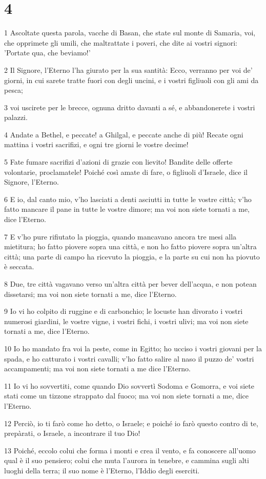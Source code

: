 \chapter{4}

\par 1 Ascoltate questa parola, vacche di Basan, che state sul monte di Samaria, voi, che opprimete gli umili, che maltrattate i poveri, che dite ai vostri signori: 'Portate qua, che beviamo!'
\par 2 Il Signore, l'Eterno l'ha giurato per la sua santità: Ecco, verranno per voi de' giorni, in cui sarete tratte fuori con degli uncini, e i vostri figliuoli con gli ami da pesca;
\par 3 voi uscirete per le brecce, ognuna dritto davanti a sé, e abbandonerete i vostri palazzi.
\par 4 Andate a Bethel, e peccate! a Ghilgal, e peccate anche di più! Recate ogni mattina i vostri sacrifizi, e ogni tre giorni le vostre decime!
\par 5 Fate fumare sacrifizi d'azioni di grazie con lievito! Bandite delle offerte volontarie, proclamatele! Poiché così amate di fare, o figliuoli d'Israele, dice il Signore, l'Eterno.
\par 6 E io, dal canto mio, v'ho lasciati a denti asciutti in tutte le vostre città; v'ho fatto mancare il pane in tutte le vostre dimore; ma voi non siete tornati a me, dice l'Eterno.
\par 7 E v'ho pure rifiutato la pioggia, quando mancavano ancora tre mesi alla mietitura; ho fatto piovere sopra una città, e non ho fatto piovere sopra un'altra città; una parte di campo ha ricevuto la pioggia, e la parte su cui non ha piovuto è seccata.
\par 8 Due, tre città vagavano verso un'altra città per bever dell'acqua, e non potean dissetarsi; ma voi non siete tornati a me, dice l'Eterno.
\par 9 Io vi ho colpito di ruggine e di carbonchio; le locuste han divorato i vostri numerosi giardini, le vostre vigne, i vostri fichi, i vostri ulivi; ma voi non siete tornati a me, dice l'Eterno.
\par 10 Io ho mandato fra voi la peste, come in Egitto; ho ucciso i vostri giovani per la spada, e ho catturato i vostri cavalli; v'ho fatto salire al naso il puzzo de' vostri accampamenti; ma voi non siete tornati a me dice l'Eterno.
\par 11 Io vi ho sovvertiti, come quando Dio sovvertì Sodoma e Gomorra, e voi siete stati come un tizzone strappato dal fuoco; ma voi non siete tornati a me, dice l'Eterno.
\par 12 Perciò, io ti farò come ho detto, o Israele; e poiché io farò questo contro di te, prepàrati, o Israele, a incontrare il tuo Dio!
\par 13 Poiché, eccolo colui che forma i monti e crea il vento, e fa conoscere all'uomo qual è il suo pensiero; colui che muta l'aurora in tenebre, e cammina sugli alti luoghi della terra; il suo nome è l'Eterno, l'Iddio degli eserciti.

